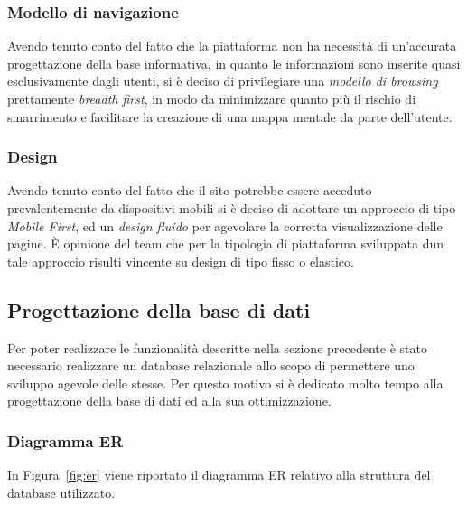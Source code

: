 \documentclass[12pt]{article}
\begin{document}
\subsubsection{Modello di navigazione}
Avendo tenuto conto del fatto che la piattaforma non ha necessit\`a di un'accurata progettazione della base informativa, in quanto le informazioni sono inserite quasi esclusivamente dagli utenti, si \`e deciso di privilegiare una \emph{modello di browsing} prettamente \emph{breadth first}, in modo da minimizzare quanto pi\`u il rischio di smarrimento e facilitare la creazione di una mappa mentale da parte dell'utente.

\subsubsection{Design}
Avendo tenuto conto del fatto che il sito potrebbe essere acceduto prevalentemente da dispositivi mobili si \`e deciso di adottare un approccio di tipo \emph{Mobile First}, ed un \emph{design fluido} per agevolare la corretta visualizzazione delle pagine. \`E opinione del team che per la tipologia di piattaforma sviluppata dun tale approccio risulti vincente su design di tipo fisso o elastico.
\pagebreak
\subsection{Progettazione della base di dati}
Per poter realizzare le funzionalit\`a descritte nella sezione precedente \`e stato necessario realizzare un database relazionale allo scopo di permettere uno sviluppo agevole delle stesse. Per questo motivo si \`e dedicato molto tempo alla progettazione della base di dati ed alla sua ottimizzazione.
\subsubsection{Diagramma ER}
In Figura~\ref{fig:er} viene riportato il diagramma ER relativo alla struttura del database utilizzato.
\end{document}
